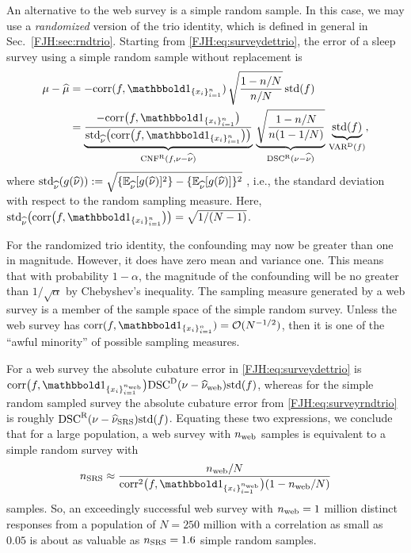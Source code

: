 \documentclass[graybox,footinfo]{svmult}
\begin{document}
An alternative to the web survey is a simple random sample.  In this 
case, we may use a 
\emph{randomized} version of the trio identity, which is defined in general in Sec.\  
\ref{FJH:sec:rndtrio}.  Starting 
from \eqref{FJH:eq:surveydettrio}, the 
error of a sleep survey using a simple random sample without replacement is
\begin{align}
\nonumber
\mu - \widehat{\mu} 
& = -\corr(f, \bbone_{\{x_i\}_{i=1}^n}) \,
\sqrt{\frac{1 - n/N}{n/N}} \, 
\std(f) \\
& = \underbrace{\frac{- \corr\bigl(f, \bbone_{\{x_i\}_{i=1}^n}\bigr)}
{\std_{\hnu} \bigl( \corr\bigl(f, \bbone_{\{x_i\}_{i=1}^n}\bigr)\bigr)}}_{\algn^\Rn(f,\nu - \hnu)} 
\, 
\underbrace{\sqrt{\frac{1-n/N}{n(1-1/N)}}}_{\disc^\Rn(\nu - \hnu)} \, 
\underbrace{\std(f)}_{\Var^\Dt(f)},
\label{FJH:eq:surveyrndtrio}
\end{align}
where $\textup{std}_{\widehat{\nu}}(g(\widehat{\nu})) := \sqrt{\{{\mathbb{E}}_{\widehat{\nu}}[g(\widehat{\nu})]^2 \}- 
\{{\mathbb{E}}_{\widehat{\nu}}[g(\widehat{\nu})]\}^2}$ , 
i.e., 
the standard deviation with 
respect to the random sampling 
measure.  Here, $\std_{\hnu} \bigl( \corr\bigl(f, 
\bbone_{\{x_i\}_{i=1}^n}\bigr)\bigr) = \sqrt{1/(N-1)}$.

For the randomized trio identity, the confounding may now be greater than one in 
magnitude.  However, it  does have zero mean and 
variance one.  This means that with probability $1-\alpha$, the magnitude of 
the confounding will be no greater than $1/\sqrt{\alpha}$ by Chebyshev's inequality. The 
sampling measure generated by a web survey is a member of the sample space of the 
simple random survey.  Unless the 
web survey has $\corr(f, \bbone_{\{x_i\}_{i=1}^n}) = \calO(N^{-1/2})$, then it is one of 
the ``awful minority'' of possible sampling measures.

For a web survey the absolute cubature error in \eqref{FJH:eq:surveydettrio} is 
$\corr\bigl(f, 
\bbone_{\{x_i\}_{i=1}^{n_{\textup{web}}}}\bigr) \disc^\Dt(\nu - \hnu_{\textup{web}}) \std(f)$, 
whereas for the simple random sampled survey the absolute cubature error from 
\eqref{FJH:eq:surveyrndtrio} is roughly $\textup{DSC}^{\textup{R}}(\nu - \widehat{\nu}_{\textup{SRS}}) \textup{std}(f)$.  
Equating these two expressions, we conclude that for a large population, a web survey with 
$n_{\textup{web}}$ samples is equivalent to a simple random survey with 
\[
n_{\textup{SRS}} \approx \frac{n_{\textup{web}}/N}{\corr^2\bigl(f, 
\bbone_{\{x_i\}_{i=1}^{n_{\textup{web}}}}\bigr)(1-n_{\textup{web}}/N)}
\]
samples.  So, an exceedingly successful web survey with $n_{\textup{web}} = 
1$ million distinct responses from a population of $N = 250$ million with a correlation as 
small as $0.05$ is about as 
valuable as $n_{\textup{SRS}} = 1.6$ simple random samples.
\end{document}
